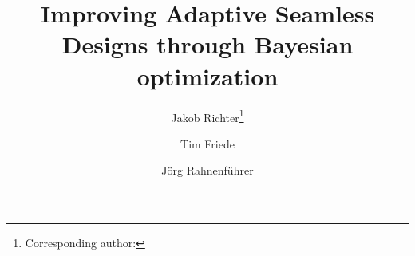 \documentclass[bimj,fleqn]{w-art}
\theoremstyle{plain}
\theoremstyle{definition}
\begin{document}

\title[Bayesian optimization of Adaptive Seamless Designs]{Improving Adaptive Seamless Designs through Bayesian optimization} %
\author[Jakob Richter {\it{et al.}}]{Jakob Richter\footnote{Corresponding author: {}}} 
\address[\inst{1}]{Fakultät Statistik, Technische Universität Dortmund, 44221 Dortmund}
\author[dd]{Tim Friede}
\address[\inst{2}]{Institut für Medizinische Statistik, Universitätsmedizin Göttingen, and Deutsches Zentrum für Herz-Kreislauf-Forschung (DZHK), Standort Göttingen, 37073 Göttingen}
\author[]{Jörg Rahnenführer} %
   

\makeatletter
\let\newtitle\@title
\makeatother
\end{document}
